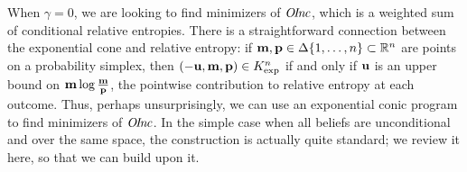 When $\gamma = 0$, we are looking to find minimizers of $\mathit{O\mskip-2.5muI\mskip-3.5mun\mskip-1.7muc}$,
which is a
weighted sum of conditional relative entropies.
There is a straightforward connection between the exponential cone and
relative entropy:
if $\mathbf{m}, \mathbf{p} \in
\Delta \{1, \ldots, n\}
\subset \mathbb R^n$ are points on
a probability simplex,
then $(-\mathbf{u}, \mathbf{m}, \mathbf{p}) \in K_{\exp}^n$ if and only if
$\mathbf{u}$ is an upper bound on $\mathbf{m} \log \frac{\mathbf{m}}{\mathbf{p}}$,
the pointwise contribution to relative entropy at each outcome.
Thus, perhaps unsurprisingly, we can use an exponential conic program to
find minimizers of $\mathit{O\mskip-2.5muI\mskip-3.5mun\mskip-1.7muc}$.
In the simple case when all beliefs are unconditional and over the same space,
the construction is actually quite standard;
we review it here, so that we can build upon it.

